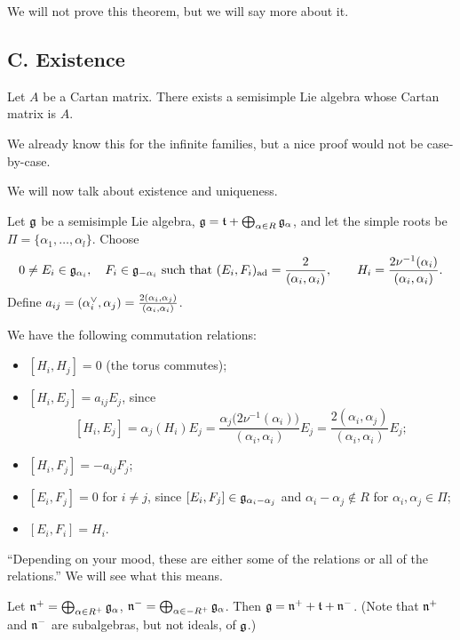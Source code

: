 We will not prove this theorem, but we will say more about it.

\subsection*{C. Existence}

\begin{theorem}
Let $A$ be a Cartan matrix. There exists a semisimple Lie algebra whose Cartan
matrix is $A$.
\end{theorem}

\begin{remark}
We already know this for the infinite families, but a nice proof would not be
case-by-case.
\end{remark}

We will now talk about existence and uniqueness.

Let $\mathfrak{g}$ be a semisimple Lie algebra, $\mathfrak{g} = \mathfrak{t} + \bigoplus_{\alpha \in R} \mathfrak{g}_\alpha$,
and let the simple roots be $\Pi = \{\alpha_1, \dots, \alpha_l\}$. Choose
\[
  0 \neq E_i \in \mathfrak{g}_{\alpha_i}, \quad F_i \in \mathfrak{g}_{-\alpha_i}
  \text{ such that } (E_i, F_i)_{\operatorname{ad}} = \frac{2}{(\alpha_i, \alpha_i)}, \qquad
  H_i = \frac{2\nu^{-1}(\alpha_i)}{(\alpha_i, \alpha_i)}.
\]
Define $a_{ij} = (\alpha_i^{\vee}, \alpha_j) = \frac{2(\alpha_i, \alpha_j)}{(\alpha_i, \alpha_i)}$.

We have the following commutation relations:
\begin{itemize}
  \item $[H_i, H_j] = 0$ (the torus commutes);
  \item $[H_i, E_j] = a_{ij}E_j$, since
    \[
      [H_i, E_j] = \alpha_j(H_i)E_j
        = \frac{\alpha_j\bigl(2\nu^{-1}(\alpha_i)\bigr)}{(\alpha_i, \alpha_i)}E_j
        = \frac{2(\alpha_i, \alpha_j)}{(\alpha_i, \alpha_i)}E_j;
    \]
  \item $[H_i, F_j] = -a_{ij}F_j$;
  \item $[E_i, F_j] = 0$ for $i \neq j$, since
    $[E_i, F_j] \in \mathfrak{g}_{\alpha_i - \alpha_j}$ and $\alpha_i - \alpha_j \notin R$
    for $\alpha_i, \alpha_j \in \Pi$;
  \item $[E_i, F_i] = H_i$.
\end{itemize}

``Depending on your mood, these are either some of the relations or all of the
relations.'' We will see what this means.

Let $\mathfrak{n}^+ = \bigoplus_{\alpha \in R^+} \mathfrak{g}_\alpha$,
$\mathfrak{n}^- = \bigoplus_{\alpha \in -R^+} \mathfrak{g}_\alpha$. Then
$\mathfrak{g} = \mathfrak{n}^+ + \mathfrak{t} + \mathfrak{n}^-$. (Note that $\mathfrak{n}^+$ and $\mathfrak{n}^-$ are subalgebras, but
not ideals, of $\mathfrak{g}$.)

